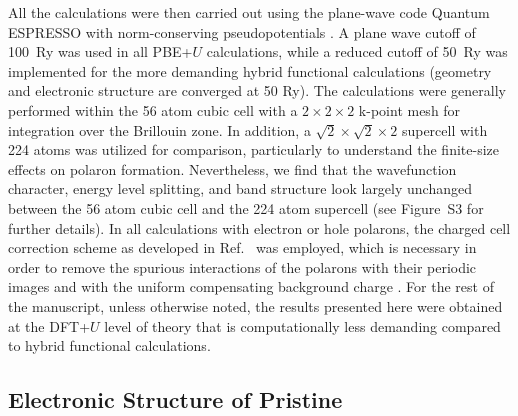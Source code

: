 All the calculations were then carried out using the plane-wave code Quantum ESPRESSO \cite{QE1} with norm-conserving pseudopotentials \cite{ONCV1}. A plane  wave cutoff of 100~Ry was used in all PBE+$U$ calculations, while a reduced cutoff of 50~Ry was implemented for the more demanding hybrid functional calculations (geometry and electronic structure are converged at 50 Ry). The calculations were generally performed within the 56 atom cubic cell with a $2\times 2\times 2$ k-point mesh for integration over the Brillouin zone. In addition, a $\sqrt{2}\times\sqrt{2}\times 2$ supercell with 224 atoms was utilized for comparison, particularly to understand the finite-size effects on polaron formation. Nevertheless, we find that the wavefunction character, energy level splitting, and band structure look largely unchanged between the 56 atom cubic cell and the 224 atom supercell (see Figure~S3 for further details). In all calculations with electron or hole polarons, the charged cell correction scheme as developed in Ref.~\cite{PING2017JCP} was employed, which is necessary in order to remove the spurious interactions of the polarons with their periodic images and with the uniform compensating background charge \cite{kokott2018first}. For the rest of the manuscript, unless otherwise noted, the results presented here were obtained at the DFT+$U$ level of theory that is computationally less demanding compared to hybrid functional calculations.


\subsection{Electronic Structure of Pristine \co{}}

